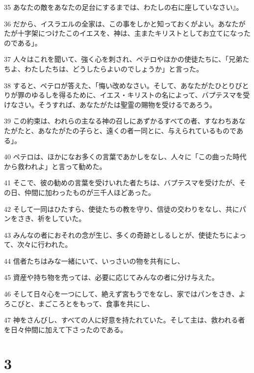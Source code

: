 \par 35 あなたの敵をあなたの足台にするまでは、わたしの右に座していなさい』。
\par 36 だから、イスラエルの全家は、この事をしかと知っておくがよい。あなたがたが十字架につけたこのイエスを、神は、主またキリストとしてお立てになったのである」。
\par 37 人々はこれを聞いて、強く心を刺され、ペテロやほかの使徒たちに、「兄弟たちよ、わたしたちは、どうしたらよいのでしょうか」と言った。
\par 38 すると、ペテロが答えた、「悔い改めなさい。そして、あなたがたひとりびとりが罪のゆるしを得るために、イエス・キリストの名によって、バプテスマを受けなさい。そうすれば、あなたがたは聖霊の賜物を受けるであろう。
\par 39 この約束は、われらの主なる神の召しにあずかるすべての者、すなわちあなたがたと、あなたがたの子らと、遠くの者一同とに、与えられているものである」。
\par 40 ペテロは、ほかになお多くの言葉であかしをなし、人々に「この曲った時代から救われよ」と言って勧めた。
\par 41 そこで、彼の勧めの言葉を受けいれた者たちは、バプテスマを受けたが、その日、仲間に加わったものが三千人ほどあった。
\par 42 そして一同はひたすら、使徒たちの教を守り、信徒の交わりをなし、共にパンをさき、祈をしていた。
\par 43 みんなの者におそれの念が生じ、多くの奇跡としるしとが、使徒たちによって、次々に行われた。
\par 44 信者たちはみな一緒にいて、いっさいの物を共有にし、
\par 45 資産や持ち物を売っては、必要に応じてみんなの者に分け与えた。
\par 46 そして日々心を一つにして、絶えず宮もうでをなし、家ではパンをさき、よろこびと、まごころとをもって、食事を共にし、
\par 47 神をさんびし、すべての人に好意を持たれていた。そして主は、救われる者を日々仲間に加えて下さったのである。

\chapter{3}

